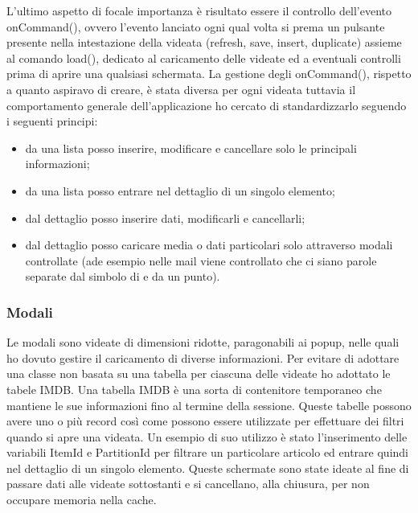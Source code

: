 L'ultimo aspetto di focale importanza è risultato essere il controllo dell'evento onCommand(), ovvero l'evento lanciato ogni qual volta si prema un pulsante presente nella intestazione della videata (refresh, save, insert, duplicate) assieme al comando load(), dedicato al caricamento delle videate ed a eventuali controlli prima di aprire una qualsiasi schermata.
La gestione degli onCommand(), rispetto a quanto aspiravo di creare, è stata diversa per ogni videata tuttavia il comportamento generale dell'applicazione ho cercato di standardizzarlo seguendo i seguenti principi:
\begin{itemize}
	\item da una lista posso inserire, modificare e cancellare solo le principali informazioni;
	\item da una lista posso entrare nel dettaglio di un singolo elemento;
	\item dal dettaglio posso inserire dati, modificarli e cancellarli;
	\item dal dettaglio posso caricare media o dati particolari solo attraverso modali controllate (ade esempio nelle mail viene controllato che ci siano parole separate dal simbolo di \@ e da un punto).
\end{itemize}


\subsubsection{Modali}
Le modali sono videate di dimensioni ridotte, paragonabili ai popup, nelle quali ho dovuto gestire il caricamento di diverse informazioni. Per evitare di adottare una classe non basata su una tabella per ciascuna delle videate ho adottato le tabele IMDB. 
Una tabella IMDB è una sorta di contenitore temporaneo che mantiene le sue informazioni fino al termine della sessione. Queste tabelle possono avere uno o più record così come possono essere utilizzate per effettuare dei filtri quando si apre una videata. Un esempio di suo utilizzo è stato l'inserimento delle variabili ItemId e PartitionId per filtrare un particolare articolo ed entrare quindi nel dettaglio di un singolo elemento.
Queste schermate sono state ideate al fine di passare dati alle videate sottostanti e si cancellano, alla chiusura, per non occupare memoria nella cache.


